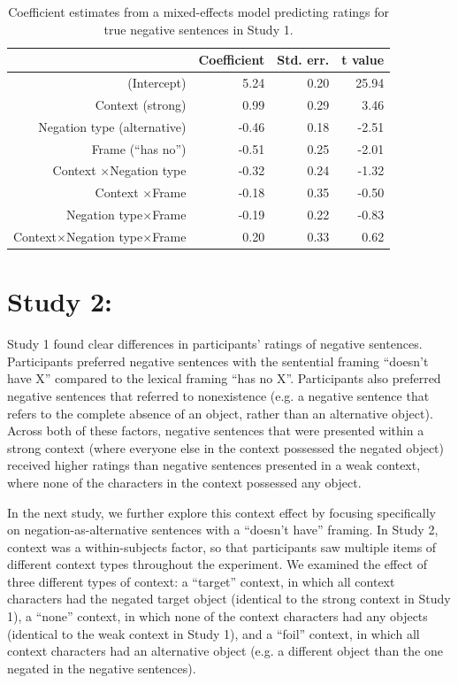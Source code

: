 \documentclass[10pt,letterpaper]{article}
\begin{document}
\begin{table}[t]
\caption{\label{tab:s1} Coefficient estimates from a mixed-effects model predicting ratings for true negative sentences in Study 1.}
\begin{center}
\small\addtolength{\tabcolsep}{-5pt}
\begin{tabular}{rrrr}
  \hline
 & Coefficient & Std. err. & t value \\ 
  \hline
(Intercept) & 5.24 & 0.20 & 25.94 \\ 
  Context (strong) & 0.99 & 0.29 & 3.46  \\ 
  Negation type (alternative) & -0.46 & 0.18 & -2.51 \\
  Frame (``has no'') & -0.51 & 0.25 & -2.01 \\ 
  Context $\times$Negation type & -0.32 & 0.24 & -1.32 \\
  Context $\times$Frame & -0.18 & 0.35 & -0.50 \\
  Negation type$\times$Frame & -0.19 & 0.22 & -0.83 \\
  Context$\times$Negation type$\times$Frame & 0.20 & 0.33 & 0.62 \\
   \hline
\end{tabular}
\vspace{-1.5cm}
\end{center}
\end{table}

\section{Study 2:}

Study 1 found clear differences in participants' ratings of negative sentences.  Participants preferred negative sentences with the sentential framing ``doesn't have X'' compared to the lexical framing ``has no X''.  Participants also preferred negative sentences that referred to nonexistence (e.g. a negative sentence that refers to the complete absence of an object, rather than an alternative object).  Across both of these factors, negative sentences that were presented within a strong context (where everyone else in the context possessed the negated object) received higher ratings than negative sentences presented in a weak context, where none of the characters in the context possessed any object.

In the next study, we further explore this context effect by focusing specifically on negation-as-alternative sentences with a ``doesn't have'' framing.  In Study 2, context was a within-subjects factor, so that participants saw multiple items of different context types throughout the experiment.  We examined the effect of three different types of context: a ``target'' context, in which all context characters had the negated target object (identical to the strong context in Study 1), a ``none'' context, in which none of the context characters had any objects (identical to the weak context in Study 1), and a ``foil'' context, in which all context characters had an alternative object (e.g. a different object than the one negated in the negative sentences). 
\end{document}
